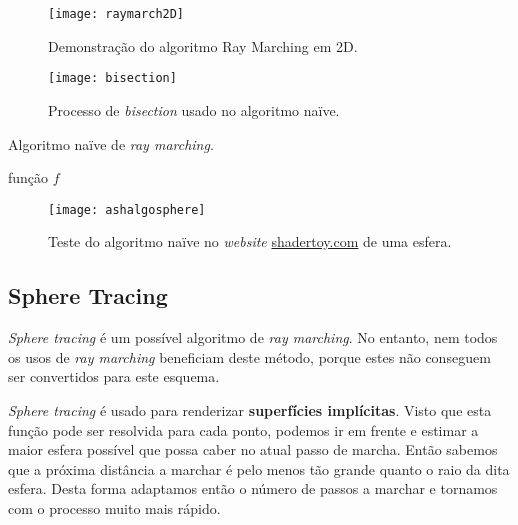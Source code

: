 \begin{figure}[!htbp]
    \centering
    \texttt{[image: raymarch2D]}
    \caption[Demonstração do algoritmo Ray Marching em 2D]{Demonstração do algoritmo Ray Marching em 2D.}
    \label{fig::rmarching2D}
\end{figure}

\begin{figure}[!htbp]
    \centering
    \texttt{[image: bisection]}
    \caption[Processo de \textit{bisection} usado no algoritmo naïve]{Processo de \textit{bisection} usado no algoritmo naïve.}
    \label{fig::rmarching2DBisection}
\end{figure}

\begin{algorithm}[!htbp]
	\caption{Algoritmo naïve de \textit{ray marching}.}
	\label{alg::raymarch_naive}
	\begin{algorithmic}
\Require função $f$      
	\end{algorithmic}
\end{algorithm}

\begin{figure}[!htbp]
	\centering
	\texttt{[image: ashalgosphere]}
	\caption[Teste do algoritmo naïve]{Teste do algoritmo naïve no \textit{website} \url{shadertoy.com} de uma esfera.}
	\label{fig::ashalgosphere}
\end{figure}


\subsection{Sphere Tracing}
\label{ssec::arte:raymarch:spheretracing}


\textit{Sphere tracing} é um possível algoritmo de \textit{ray marching}. No entanto, nem todos os usos de \textit{ray marching} beneficiam deste método, porque estes não conseguem ser convertidos para este esquema.

\textit{Sphere tracing} é usado para renderizar \textbf{superfícies implícitas}. Visto que esta função pode ser resolvida para cada ponto, podemos ir em frente e estimar a maior esfera possível que possa caber no atual passo de marcha. Então sabemos que a próxima distância a marchar é pelo menos tão grande quanto o raio da dita esfera. Desta forma adaptamos então o número de passos a marchar e tornamos com o processo muito mais rápido.

